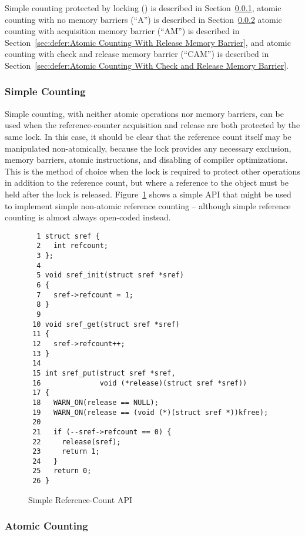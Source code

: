 Simple counting protected by locking () is described in
Section~\ref{sec:defer:Simple Counting},
atomic counting with no memory barriers (``A'') is described in
Section~\ref{sec:defer:Atomic Counting}
atomic counting with acquisition memory barrier (``AM'') is described in
Section~\ref{sec:defer:Atomic Counting With Release Memory Barrier},
and 
atomic counting with check and release memory barrier (``CAM'') is described in
Section~\ref{sec:defer:Atomic Counting With Check and Release Memory Barrier}.

\subsubsection{Simple Counting}
\label{sec:defer:Simple Counting}

Simple counting, with neither atomic operations nor memory barriers,
can be used when the reference-counter acquisition and release are
both protected by the same lock.
In this case, it should be clear that the reference count itself
may be manipulated non-atomically, because the lock provides any
necessary exclusion, memory barriers, atomic instructions, and disabling
of compiler optimizations.
This is the method of choice when the lock is required to protect
other operations in addition to the reference count, but where
a reference to the object must be held after the lock is released.
Figure~\ref{fig:defer:Simple Reference-Count API} shows a simple
API that might be used to implement simple non-atomic reference
counting -- although simple reference counting is almost always
open-coded instead.

\begin{figure}[htbp]
{ \scriptsize
\begin{verbatim}
  1 struct sref {
  2   int refcount;
  3 };
  4 
  5 void sref_init(struct sref *sref)
  6 {
  7   sref->refcount = 1;
  8 }
  9 
 10 void sref_get(struct sref *sref)
 11 {
 12   sref->refcount++;
 13 }
 14 
 15 int sref_put(struct sref *sref,
 16              void (*release)(struct sref *sref))
 17 {
 18   WARN_ON(release == NULL);
 19   WARN_ON(release == (void (*)(struct sref *))kfree);
 20 
 21   if (--sref->refcount == 0) {
 22     release(sref);
 23     return 1;
 24   }
 25   return 0;
 26 }
\end{verbatim}
}
\caption{Simple Reference-Count API}
\label{fig:defer:Simple Reference-Count API}
\end{figure}

\subsubsection{Atomic Counting}
\label{sec:defer:Atomic Counting}


